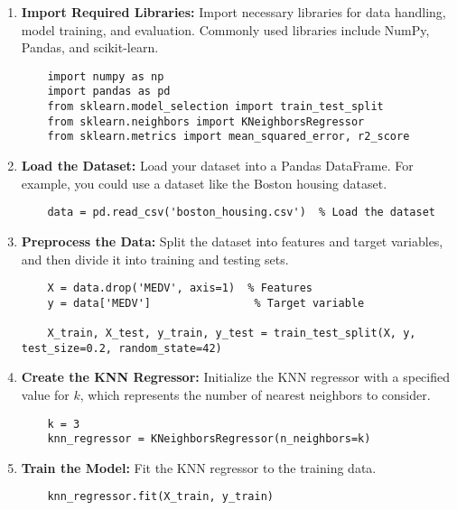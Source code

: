 \begin{enumerate}
    \item \textbf{Import Required Libraries:}
    Import necessary libraries for data handling, model training, and evaluation. Commonly used libraries include NumPy, Pandas, and scikit-learn.

    \begin{verbatim}
    import numpy as np
    import pandas as pd
    from sklearn.model_selection import train_test_split
    from sklearn.neighbors import KNeighborsRegressor
    from sklearn.metrics import mean_squared_error, r2_score
    \end{verbatim}

    \item \textbf{Load the Dataset:}
    Load your dataset into a Pandas DataFrame. For example, you could use a dataset like the Boston housing dataset.

    \begin{verbatim}
    data = pd.read_csv('boston_housing.csv')  % Load the dataset
    \end{verbatim}

    \item \textbf{Preprocess the Data:}
    Split the dataset into features and target variables, and then divide it into training and testing sets.

    \begin{verbatim}
    X = data.drop('MEDV', axis=1)  % Features
    y = data['MEDV']                % Target variable

    X_train, X_test, y_train, y_test = train_test_split(X, y, test_size=0.2, random_state=42)
    \end{verbatim}

    \item \textbf{Create the KNN Regressor:}
    Initialize the KNN regressor with a specified value for \(k\), which represents the number of nearest neighbors to consider.

    \begin{verbatim}
    k = 3
    knn_regressor = KNeighborsRegressor(n_neighbors=k)
    \end{verbatim}

    \item \textbf{Train the Model:}
    Fit the KNN regressor to the training data.

    \begin{verbatim}
    knn_regressor.fit(X_train, y_train)
    \end{verbatim}


\end{enumerate}
